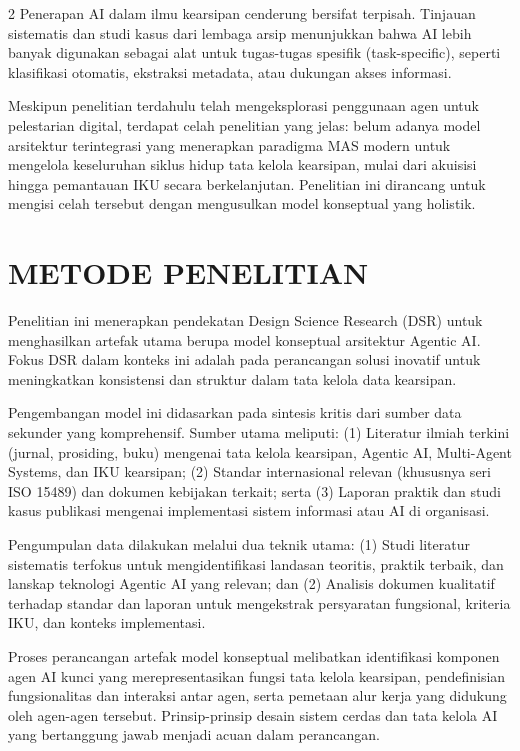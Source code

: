 \documentclass[12pt,a4paper]{article}
\begin{document}
\begin{multicols}{2}
Penerapan AI dalam ilmu kearsipan cenderung bersifat terpisah. Tinjauan sistematis dan studi kasus dari lembaga arsip menunjukkan bahwa AI lebih banyak digunakan sebagai alat untuk tugas-tugas spesifik (task-specific), seperti klasifikasi otomatis, ekstraksi metadata, atau dukungan akses informasi.

Meskipun penelitian terdahulu telah mengeksplorasi penggunaan agen untuk pelestarian digital, terdapat celah penelitian yang jelas: belum adanya model arsitektur terintegrasi yang menerapkan paradigma MAS modern untuk mengelola keseluruhan siklus hidup tata kelola kearsipan, mulai dari akuisisi hingga pemantauan IKU secara berkelanjutan. Penelitian ini dirancang untuk mengisi celah tersebut dengan mengusulkan model konseptual yang holistik.

\section{METODE PENELITIAN}

Penelitian ini menerapkan pendekatan Design Science Research (DSR) untuk menghasilkan artefak utama berupa model konseptual arsitektur Agentic AI. Fokus DSR dalam konteks ini adalah pada perancangan solusi inovatif untuk meningkatkan konsistensi dan struktur dalam tata kelola data kearsipan.

Pengembangan model ini didasarkan pada sintesis kritis dari sumber data sekunder yang komprehensif. Sumber utama meliputi: (1) Literatur ilmiah terkini (jurnal, prosiding, buku) mengenai tata kelola kearsipan, Agentic AI, Multi-Agent Systems, dan IKU kearsipan; (2) Standar internasional relevan (khususnya seri ISO 15489) dan dokumen kebijakan terkait; serta (3) Laporan praktik dan studi kasus publikasi mengenai implementasi sistem informasi atau AI di organisasi.

Pengumpulan data dilakukan melalui dua teknik utama: (1) Studi literatur sistematis terfokus untuk mengidentifikasi landasan teoritis, praktik terbaik, dan lanskap teknologi Agentic AI yang relevan; dan (2) Analisis dokumen kualitatif terhadap standar dan laporan untuk mengekstrak persyaratan fungsional, kriteria IKU, dan konteks implementasi.

Proses perancangan artefak model konseptual melibatkan identifikasi komponen agen AI kunci yang merepresentasikan fungsi tata kelola kearsipan, pendefinisian fungsionalitas dan interaksi antar agen, serta pemetaan alur kerja yang didukung oleh agen-agen tersebut. Prinsip-prinsip desain sistem cerdas dan tata kelola AI yang bertanggung jawab menjadi acuan dalam perancangan.


\end{multicols}
\end{document}
